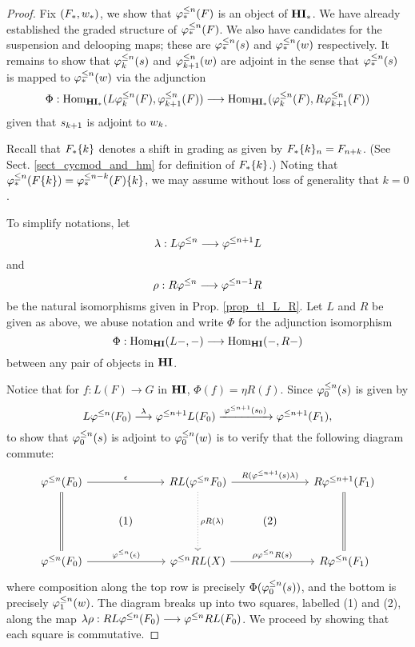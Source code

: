 \begin{proof}
Fix $(F_*, \deloop_*)$, we show that $\tlHM{n}(F)$ is an object of
$\HM$. We have already established the graded structure of 
$\tlHM{n}(F)$. We also have candidates for the suspension and 
delooping maps; these are $\suspTL{n}$ and $\deloopTL{n}$ 
respectively. It remains to show that $\suspTL[k]{n}$ and 
$\deloopTL[k + 1]{n}$ are adjoint in the sense that $\suspTL{n}$ is 
mapped to $\deloopTL{n}$ via the adjunction 
\[
\Phi: \homHM(L \tlHM[k]{n}(F), \tlHM[k + 1]{n}(F))
\to \homHM(\tlHM[k]{n}(F), R \tlHM[k + 1]{n}(F))
\]
given that $\susp_{k + 1}$ is adjoint to $\deloop_k$.

Recall that $\shift[k]{F_*}$ denotes a shift in grading as given by 
$\shift[k]{F_*}_n = F_{n + k}$. (See Sect. \ref{sect_cycmod_and_hm} 
for definition of $\shift[k]{F_*}$.) Noting that 
$\tlHM{n}(\shift[k]{F}) = \shift[k]{\tlHM{n - k}(F)}$, we may 
assume without loss of generality that $k = 0$. 

To simplify notations, let
\[
\lambda : L\tlHI{n} \to \tlHI{n + 1}L
\]
and 
\[
\rho : R\tlHI{n} \to \tlHI{n - 1}R
\]
be the natural isomorphisms given in Prop. \ref{prop_tl_L_R}. 
Let $L$ and $R$ be given as above,  we abuse notation and write $\Phi$ for the 
adjunction isomorphism
\[
\Phi: \homHI(L-, -) \to \homHI(-,R-)
\]
between any pair of objects in $\HI$.

Notice that for $f: L(F) \to G$ in $\HI$, $\Phi(f) = \eta R(f)$.
Since $\suspTL[0]{n}$ is given by
\[
L\tlHI{n}(F_0) \stackrel{\lambda}{\to} \tlHI{n + 1} L(F_0)
   \xrightarrow{\;\tlHI{n + 1}(\susp_0)\;} \tlHI{n + 1}(F_1),
\]
to show that $\suspTL[0]{n}$ is adjoint to $\deloopTL[0]{n}$ is to
verify that the following diagram commute:
\[
\begin{tikzcd}
\tlHI{n}(F_0) \arrow{rr}{\epsilon} \arrow[equals]{dd} &&
RL (\tlHI{n}F_0) \arrow{rr}{R(\tlHI{n + 1}(\susp) \lambda)} 
\arrow[dotted]{dd}{\rho R(\lambda)}&&
R \tlHI{n + 1} (F_1) \arrow[equals]{dd} \\
& (1) && (2) \\
\tlHI{n}(F_0) \arrow{rr}{\tlHI{n}(\epsilon)} &&
\tlHI{n} RL(X) \arrow{rr}{\rho \tlHI{n} R(\susp)} &&
R\tlHI{n}(F_1)
\end{tikzcd}
\]
where composition along the top row is precisely 
$\Phi(\suspTL[0]{n})$, and the bottom is precisely 
$\deloopTL[1]{n}$. The diagram breaks up into two squares,
labelled (1) and (2), along the map $\lambda \rho: RL 
\tlHI{n}(F_0) \to \tlHI{n} RL(F_0)$. We proceed by showing that 
each square is commutative.


\end{proof}
